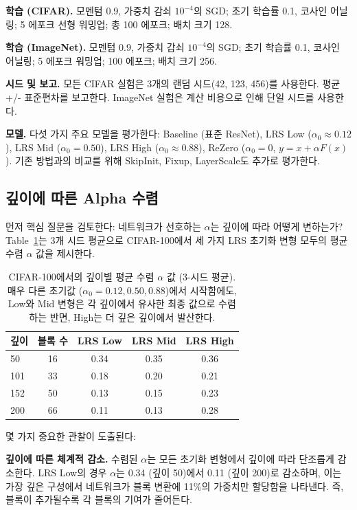\documentclass[preprint,12pt]{elsarticle}
\begin{document}
\textbf{학습 (CIFAR).} 모멘텀 0.9, 가중치 감쇠 $10^{-4}$의 SGD; 초기 학습률 0.1, 코사인 어닐링; 5 에포크 선형 워밍업; 총 100 에포크; 배치 크기 128.

\textbf{학습 (ImageNet).} 모멘텀 0.9, 가중치 감쇠 $10^{-4}$의 SGD; 초기 학습률 0.1, 코사인 어닐링; 5 에포크 워밍업; 100 에포크; 배치 크기 256.

\textbf{시드 및 보고.} 모든 CIFAR 실험은 3개의 랜덤 시드(42, 123, 456)를 사용한다. 평균 +/- 표준편차를 보고한다. ImageNet 실험은 계산 비용으로 인해 단일 시드를 사용한다.

\textbf{모델.} 다섯 가지 주요 모델을 평가한다: Baseline (표준 ResNet), LRS Low ($\alpha_0 \approx 0.12$), LRS Mid ($\alpha_0 = 0.50$), LRS High ($\alpha_0 \approx 0.88$), ReZero ($\alpha_0 = 0$, $y = x + \alpha F(x)$). 기존 방법과의 비교를 위해 SkipInit, Fixup, LayerScale도 추가로 평가한다.

\subsection{깊이에 따른 Alpha 수렴}
\label{sec:alpha_convergence}

먼저 핵심 질문을 검토한다: 네트워크가 선호하는 $\alpha$는 깊이에 따라 어떻게 변하는가? Table~\ref{tab:depth_alpha}는 3개 시드 평균으로 CIFAR-100에서 세 가지 LRS 초기화 변형 모두의 평균 수렴 $\alpha$ 값을 제시한다.

\begin{table}[t]
\centering
\caption{CIFAR-100에서의 깊이별 평균 수렴 $\alpha$ 값 (3-시드 평균). 매우 다른 초기값 ($\alpha_0 = 0.12, 0.50, 0.88$)에서 시작함에도, Low와 Mid 변형은 각 깊이에서 유사한 최종 값으로 수렴하는 반면, High는 더 깊은 깊이에서 발산한다.}
\label{tab:depth_alpha}
\begin{tabular}{lcccc}
\toprule
\textbf{깊이} & \textbf{블록 수} & \textbf{LRS Low} & \textbf{LRS Mid} & \textbf{LRS High} \\
\midrule
50  & 16 & 0.34 & 0.35 & 0.36 \\
101 & 33 & 0.18 & 0.20 & 0.21 \\
152 & 50 & 0.13 & 0.15 & 0.23 \\
200 & 66 & 0.11 & 0.13 & 0.28 \\
\bottomrule
\end{tabular}
\end{table}

몇 가지 중요한 관찰이 도출된다:

\textbf{깊이에 따른 체계적 감소.} 수렴된 $\alpha$는 모든 초기화 변형에서 깊이에 따라 단조롭게 감소한다. LRS Low의 경우 $\alpha$는 0.34 (깊이 50)에서 0.11 (깊이 200)로 감소하며, 이는 가장 깊은 구성에서 네트워크가 블록 변환에 11\%의 가중치만 할당함을 나타낸다. 즉, 블록이 추가될수록 각 블록의 기여가 줄어든다.
\end{document}
